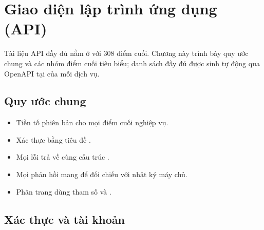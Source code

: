 \chapter{Giao diện lập trình ứng dụng (API)}

Tài liệu API đầy đủ nằm ở  với 308 điểm cuối. Chương này trình bày
quy ước chung và các nhóm điểm cuối tiêu biểu; danh sách đầy đủ được sinh tự động qua
OpenAPI tại  của mỗi dịch vụ.

\section{Quy ước chung}

\begin{itemize}[leftmargin=1.4em]
  \item Tiền tố phiên bản  cho mọi điểm cuối nghiệp vụ.
  \item Xác thực bằng tiêu đề .
  \item Mọi lỗi trả về cùng cấu trúc .
  \item Mọi phản hồi mang  để đối chiếu với nhật ký máy chủ.
  \item Phân trang dùng tham số  và .
\end{itemize}

\section{Xác thực và tài khoản}

